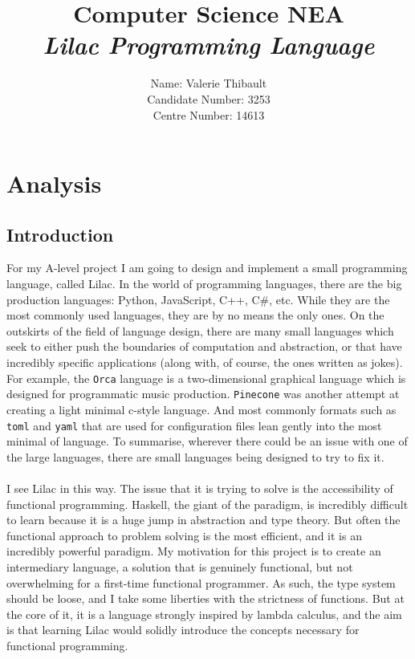 \documentclass[a4paper, 12pt]{article}
\title{\textbf{Computer Science NEA}\\ \em Lilac Programming Language}
\author{Name: Valerie Thibault\\Candidate Number: 3253\\Centre Number: 14613}
\date{}
\begin{document}
\maketitle

\tableofcontents

\section{Analysis}\label{sec:analysis}
\subsection{Introduction}\label{sec:introduction}
For my A-level project I am going to design and implement a small programming language, called Lilac. In the world of programming languages, there are the big production languages: Python, JavaScript, C++, C\#, etc. While they are the most commonly used languages, they are by no means the only ones. On the outskirts of the field of language design, there are many small languages which seek to either push the boundaries of computation and abstraction, or that have incredibly specific applications (along with, of course, the ones written as jokes). For example, the \verb|Orca| language is a two-dimensional graphical language which is designed for programmatic music production. \verb|Pinecone| was another attempt at creating a light minimal c-style language. And most commonly formats such as \verb|toml| and \verb|yaml| that are used for configuration files lean gently into the most minimal of language. To summarise, wherever there could be an issue with one of the large languages, there are small languages being designed to try to fix it.\\
\\
I see Lilac in this way. The issue that it is trying to solve is the accessibility of functional programming. Haskell, the giant of the paradigm, is incredibly difficult to learn because it is a huge jump in abstraction and type theory. But often the functional approach to problem solving is the most efficient, and it is an incredibly powerful paradigm. My motivation for this project is to create an intermediary language, a solution that is genuinely functional, but not overwhelming for a first-time functional programmer. As such, the type system should be loose, and I take some liberties with the strictness of functions. But at the core of it, it is a language strongly inspired by lambda calculus, and the aim is that learning Lilac would solidly introduce the concepts necessary for functional programming.\\
\\
\end{document}
